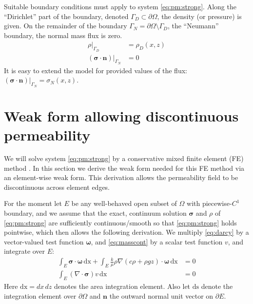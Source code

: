 \documentclass[11pt]{amsart}
\newcommand{\bn}{\mathbf{n}}
\newcommand{\bsigma}{\bm{\sigma}}
\newcommand{\bomega}{\bm{\omega}}
\newcommand{\dx}{\mathrm{dx}}
\newcommand{\ds}{\mathrm{ds}}
\newcommand{\Div}{\nabla\cdot}
\newcommand{\grad}{\nabla}
\begin{document}
Suitable boundary conditions must apply to system \eqref{eq:pm:strong}.  Along the ``Dirichlet'' part of the boundary, denoted $\Gamma_D \subset \partial\Omega$, the density (or pressure) is given.  On the remainder of the boundary $\Gamma_N = \partial\Omega \setminus \Gamma_D$, the ``Neumann'' boundary, the normal mass flux is zero. 
\begin{subequations}
\label{eq:strongbcs}
\begin{align}
\rho|_{\Gamma_D}               &= \rho_D(x,z) \\
(\bsigma\cdot \bn)|_{\Gamma_N} &= 0
\end{align}
\end{subequations}
It is easy to extend the model for provided values of the flux: $(\bsigma\cdot \bn)|_{\Gamma_N}= \sigma_N(x,z)$.

\section{Weak form allowing discontinuous permeability}

We will solve system \eqref{eq:pm:strong} by a conservative mixed finite element (FE) method \citep{Boffi2013}.  In this section we derive the weak form needed for this FE method via an element-wise weak form.  This derivation allows the permeability field to be discontinuous across element edges.

For the moment let $E$ be any well-behaved open subset of $\Omega$ with piecewise-$C^1$ boundary, and we assume that the exact, continuum solution $\bsigma$ and $\rho$ of \eqref{eq:pm:strong} are sufficiently continuous/smooth so that \eqref{eq:pm:strong} holds pointwise, which then allows the following derivation.  We multiply \eqref{eq:darcy} by a vector-valued test function $\bomega$, and \eqref{eq:masscont} by a scalar test function $v$, and integrate over $E$:
\begin{subequations}
\label{eq:pm:elementweak}
\begin{align}
\int_E \bsigma\cdot \bomega\,\dx + \int_E \frac{k}{\mu} \rho \grad\left(c \rho + \rho g z\right) \cdot \bomega\,\dx &= 0 \\
\int_E (\Div \bsigma) v\,\dx &= 0
\end{align}
\end{subequations}
Here $\dx = dx\,dz$ denotes the area integration element.  Also let $\ds$ denote the integration element over $\partial\Omega$ and $\bn$ the outward normal unit vector on $\partial E$.
\end{document}
